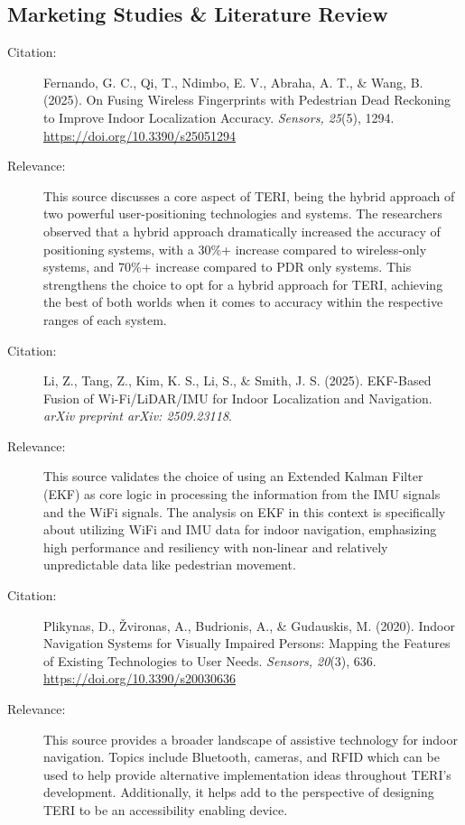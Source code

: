\documentclass{article}
\begin{document}
\subsection{Marketing Studies \& Literature Review}
\begin{description}
    \item[Citation:] Fernando, G. C., Qi, T., Ndimbo, E. V., Abraha, A. T., \& Wang, B. (2025). On Fusing Wireless Fingerprints with Pedestrian Dead Reckoning to Improve Indoor Localization Accuracy. \textit{Sensors, 25}(5), 1294. \href{https://doi.org/10.3390/s25051294}{https://doi.org/10.3390/s25051294}
    \item[Relevance:] This source discusses a core aspect of TERI, being the hybrid approach of two powerful user-positioning technologies and systems. The researchers observed that a hybrid approach dramatically increased the accuracy of positioning systems, with a 30\%+ increase compared to wireless-only systems, and 70\%+ increase compared to PDR only systems. This strengthens the choice to opt for a hybrid approach for TERI, achieving the best of both worlds when it comes to accuracy within the respective ranges of each system.

    \item[Citation:] Li, Z., Tang, Z., Kim, K. S., Li, S., \& Smith, J. S. (2025). EKF-Based Fusion of Wi-Fi/LiDAR/IMU for Indoor Localization and Navigation. \textit{arXiv preprint arXiv: 2509.23118}.
    \item[Relevance:] This source validates the choice of using an Extended Kalman Filter (EKF) as core logic in processing the information from the IMU signals and the WiFi signals. The analysis on EKF in this context is specifically about utilizing WiFi and IMU data for indoor navigation, emphasizing high performance and resiliency with non-linear and relatively unpredictable data like pedestrian movement.

    \item[Citation:] Plikynas, D., Žvironas, A., Budrionis, A., \& Gudauskis, M. (2020). Indoor Navigation Systems for Visually Impaired Persons: Mapping the Features of Existing Technologies to User Needs. \textit{Sensors, 20}(3), 636. \href{https://doi.org/10.3390/s20030636}{https://doi.org/10.3390/s20030636}
    \item[Relevance:] This source provides a broader landscape of assistive technology for indoor navigation. Topics include Bluetooth, cameras, and RFID which can be used to help provide alternative implementation ideas throughout TERI's development. Additionally, it helps add to the perspective of designing TERI to be an accessibility enabling device.


\end{description}
\end{document}
